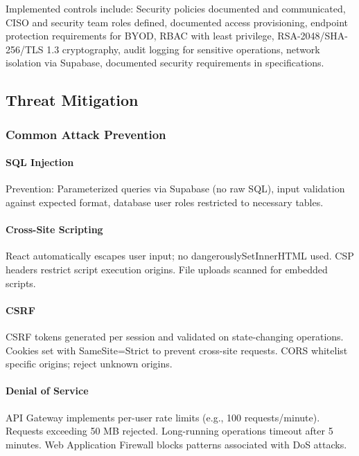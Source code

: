 \documentclass[12pt,oneside,openright,a4paper]{cpe-english-project}
\begin{document}
Implemented controls include: Security policies documented and communicated, CISO and security team roles defined, documented access provisioning, endpoint protection requirements for BYOD, RBAC with least privilege, RSA-2048/SHA-256/TLS 1.3 cryptography, audit logging for sensitive operations, network isolation via Supabase, documented security requirements in specifications.

\vspace{1em}

\subsection{Threat Mitigation}

\subsubsection{Common Attack Prevention}

\paragraph{SQL Injection}

Prevention: Parameterized queries via Supabase (no raw SQL), input validation against expected format, database user roles restricted to necessary tables.

\paragraph{Cross-Site Scripting}

React automatically escapes user input; no dangerouslySetInnerHTML used. CSP headers restrict script execution origins. File uploads scanned for embedded scripts.

\paragraph{CSRF}

CSRF tokens generated per session and validated on state-changing operations. Cookies set with SameSite=Strict to prevent cross-site requests. CORS whitelist specific origins; reject unknown origins.

\paragraph{Denial of Service}

API Gateway implements per-user rate limits (e.g., 100 requests/minute). Requests exceeding 50 MB rejected. Long-running operations timeout after 5 minutes. Web Application Firewall blocks patterns associated with DoS attacks.
\end{document}
